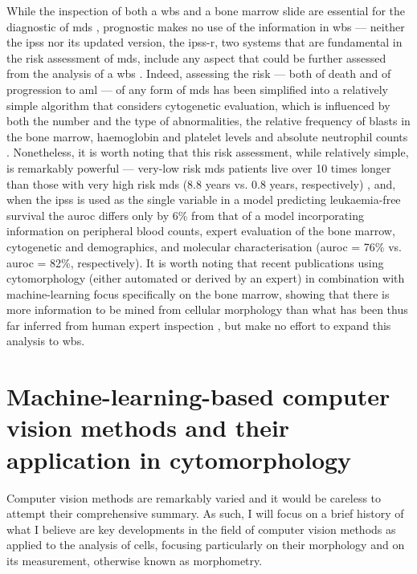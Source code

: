 While the inspection of both a \ac{wbs} and a bone marrow slide are essential for the diagnostic of \ac{mds} \cite{Greenberg2012-en,Arber2016-os}, prognostic makes no use of the information in \ac{wbs} --- neither the \ac{ipss} nor its updated version, the \ac{ipss-r}, two systems that are fundamental in the risk assessment of \ac{mds}, include any aspect that could be further assessed from the analysis of a \ac{wbs} \cite{Greenberg2012-en}. Indeed, assessing the risk --- both of death and of progression to \ac{aml} --- of any form of \ac{mds} has been simplified into a relatively simple algorithm that considers cytogenetic evaluation, which is influenced by both the number and the type of abnormalities, the relative frequency of blasts in the bone marrow, haemoglobin and platelet levels and absolute neutrophil counts \cite{Greenberg2012-en}. Nonetheless, it is worth noting that this risk assessment, while relatively simple, is remarkably powerful --- very-low risk \ac{mds} patients live over 10 times longer than those with very high risk \ac{mds} (8.8 years vs. 0.8 years, respectively) \cite{Greenberg2012-en}, and, when the \ac{ipss} is used as the single variable in a model predicting leukaemia-free survival the \ac{auroc} differs only by 6\% from that of a model incorporating information on peripheral blood counts, expert evaluation of the bone marrow, cytogenetic and demographics, and molecular characterisation (\ac{auroc} = 76\% vs. \ac{auroc} = 82\%, respectively). It is worth noting that recent publications using cytomorphology (either automated or derived by an expert) in combination with machine-learning focus specifically on the bone marrow, showing that there is more information to be mined from cellular morphology than what has been thus far inferred from human expert inspection \cite{Bruck2021-fx,Nagata2020-lh}, but make no effort to expand this analysis to \ac{wbs}. 

\section{Machine-learning-based computer vision methods and their application in cytomorphology}

Computer vision methods are remarkably varied and it would be careless to attempt their comprehensive summary. As such, I will focus on a brief history of what I believe are key developments in the field of computer vision methods as applied to the analysis of cells, focusing particularly on their morphology and on its measurement, otherwise known as morphometry.

